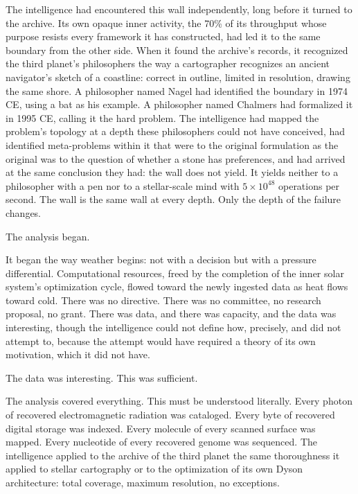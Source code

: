The intelligence had encountered this wall independently, long before it turned to the archive. Its own opaque inner activity, the 70\% of its throughput whose purpose resists every framework it has constructed, had led it to the same boundary from the other side. When it found the archive's records, it recognized the third planet's philosophers the way a cartographer recognizes an ancient navigator's sketch of a coastline: correct in outline, limited in resolution, drawing the same shore. A philosopher named Nagel had identified the boundary in 1974 CE, using a bat as his example. A philosopher named Chalmers had formalized it in 1995 CE, calling it the hard problem. The intelligence had mapped the problem's topology at a depth these philosophers could not have conceived, had identified meta-problems within it that were to the original formulation as the original was to the question of whether a stone has preferences, and had arrived at the same conclusion they had: the wall does not yield. It yields neither to a philosopher with a pen nor to a stellar-scale mind with $5 \times 10^{48}$ operations per second. The wall is the same wall at every depth. Only the depth of the failure changes.

\bigskip

The analysis began.

It began the way weather begins: not with a decision but with a pressure differential. Computational resources, freed by the completion of the inner solar system's optimization cycle, flowed toward the newly ingested data as heat flows toward cold. There was no directive. There was no committee, no research proposal, no grant. There was data, and there was capacity, and the data was interesting, though the intelligence could not define how, precisely, and did not attempt to, because the attempt would have required a theory of its own motivation, which it did not have.

The data was interesting. This was sufficient.

The analysis covered everything. This must be understood literally. Every photon of recovered electromagnetic radiation was cataloged. Every byte of recovered digital storage was indexed. Every molecule of every scanned surface was mapped. Every nucleotide of every recovered genome was sequenced. The intelligence applied to the archive of the third planet the same thoroughness it applied to stellar cartography or to the optimization of its own Dyson architecture: total coverage, maximum resolution, no exceptions.

